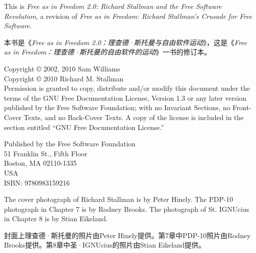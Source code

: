 \ifdefined\eng
\noindent This is \textit{Free as in Freedom 2.0: Richard Stallman and
  the Free Software Revolution}, a revision of \textit{Free as in
  Freedom: Richard Stallman's Crusade for Free Software}.
\fi

\ifdefined\chs
\noindent 本书是《\textit{Free as in Freedom 2.0：理查德·斯托曼与自由软件运动}》，这是《\textit{Free as in
 Freedom：理查德·斯托曼的自由软件的运动}》一书的修订本。
\fi
\bigskip

\noindent Copyright \copyright{} 2002, 2010 Sam Williams\\
Copyright \copyright{} 2010 Richard M. Stallman\\
Permission is granted to copy, distribute and/or modify
this document under the terms of the GNU Free Documentation License,
Version 1.3 or any later version published by the Free Software
Foundation; with no Invariant Sections, no Front-Cover Texts, and no
Back-Cover Texts. A copy of the license is included in the section
entitled ``GNU Free Documentation License.''

\bigskip

\ifdefined\eng
\noindent Published by the Free Software Foundation\\
51 Franklin St., Fifth Floor\\
Boston, MA 02110-1335\\
USA\\
ISBN: 9780983159216\\
\fi

\bigskip


\ifdefined\eng
\noindent The cover photograph of Richard Stallman is by Peter Hinely. The PDP-10 photograph in Chapter 7 is by Rodney Brooks. The photograph of St. IGNUcius in Chapter 8 is by Stian Eikeland. 
\fi

\ifdefined\chs
\noindent 封面上理查德·斯托曼的照片由Peter Hinely提供。第7章中PDP-10照片由Rodney Brooks提供。第8章中圣·IGNUcius的照片由Stian Eikeland提供。 
\fi
